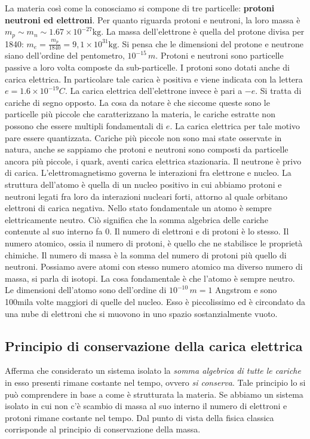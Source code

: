 La materia così come la conosciamo si compone di tre particelle: \textbf{protoni neutroni ed elettroni}. Per quanto riguarda protoni e neutroni, la loro massa è $m_p \sim m_n \sim  1.67 \times 10^{-27} \text{kg}$.
La massa dell'elettrone è quella del protone divisa per 1840: $m_e= \frac{m_p}{1840}=9,1\times 10^{31} \text{kg}$.
Si pensa che le dimensioni del protone e neutrone siano dell'ordine del pentometro, $10^{-15}\,m$.
Protoni e neutroni sono particelle passive a loro volta composte da sub-particelle. I protoni sono dotati anche di carica elettrica. In particolare tale carica è positiva e viene indicata con la lettera $e=1.6\times 10^{-19} C$.
La carica elettrica dell'elettrone invece è pari a $-e$. Si tratta di cariche di segno opposto. La cosa da notare è che siccome queste sono le particelle più piccole che caratterizzano la materia, le cariche estratte non possono che essere multipli fondamentali di $e$. La carica elettrica per tale motivo pare essere quantizzata. Cariche più piccole non sono mai state osservate in natura, anche se sappiamo che protoni e neutroni sono composti da particelle ancora più piccole, i quark, aventi carica elettrica stazionaria. Il neutrone è privo di carica.
L'elettromagnetismo governa le interazioni fra elettrone e nucleo. La struttura dell'atomo è quella di un nucleo positivo in cui abbiamo protoni e neutroni legati fra loro da interazioni nucleari forti, attorno al quale orbitano elettroni di carica negativa. Nello stato fondamentale un atomo è sempre elettricamente neutro. Ciò significa che la somma algebrica delle cariche contenute al suo interno fa $0$. Il numero di elettroni e di protoni è lo stesso. Il numero atomico, ossia il numero di protoni, è quello che ne stabilisce le proprietà chimiche.
Il numero di massa è la somma del numero di protoni più quello di neutroni.
Possiamo avere atomi con stesso numero atomico ma diverso numero di massa, si parla di isotopi. La cosa fondamentale è che l'atomo è sempre neutro. Le dimensioni dell'atomo sono dell'ordine di $10^{-10}\,m = 1 $ Angstrom e sono 100mila volte maggiori di quelle del nucleo. Esso è piccolissimo ed è circondato da una nube di elettroni che si muovono in uno spazio sostanzialmente vuoto.

\subsection{Principio di conservazione della carica elettrica}

Afferma che considerato un sistema isolato la \emph{somma algebrica di tutte le cariche} in esso presenti rimane costante nel tempo, ovvero \emph{si conserva}. Tale principio lo si può comprendere in base a come è strutturata la materia. Se abbiamo un sistema isolato in cui non c'è scambio di massa al suo interno il numero di elettroni e protoni rimane costante nel tempo. Dal punto di vista della fisica classica corrisponde al principio di conservazione della massa.

